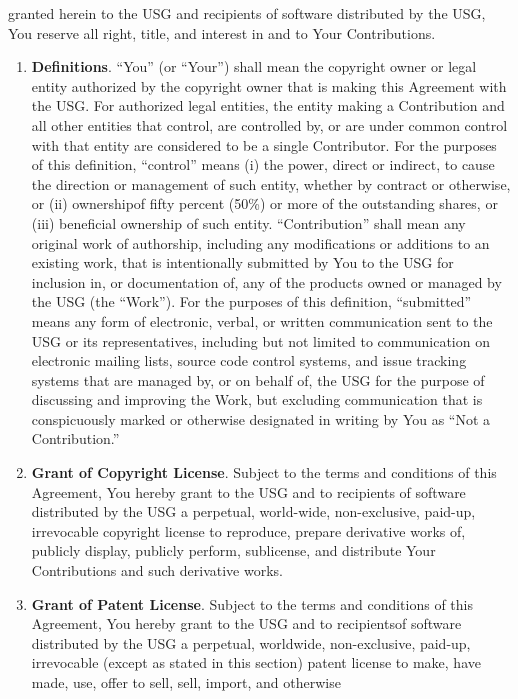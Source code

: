 \documentclass[8pt]{article}
\begin{document}
\begin{Form}
granted herein to the USG and recipients of software distributed by the
USG, You reserve all right, title, and interest in and to Your
Contributions.
\begin{enumerate}
\def\labelenumi{\arabic{enumi}.}
\item
  \textbf{Definitions}. ``You'' (or ``Your'') shall mean the copyright
  owner or legal entity authorized by the copyright owner that is making
  this Agreement with the USG. For authorized legal entities, the entity
  making a Contribution and all other entities that control, are
  controlled by, or are under common control with that entity are
  considered to be a single Contributor. For the purposes of this
  definition, ``control'' means (i) the power, direct or indirect, to
  cause the direction or management of such entity, whether by contract
  or otherwise, or (ii) ownershipof fifty percent (50\%) or more of the
  outstanding shares, or (iii) beneficial ownership of such entity.
  ``Contribution'' shall mean any original work of authorship, including
  any modifications or additions to an existing work, that is
  intentionally submitted by You to the USG for inclusion in, or
  documentation of, any of the products owned or managed by the USG (the
  ``Work''). For the purposes of this definition, ``submitted'' means
  any form of electronic, verbal, or written communication sent to the
  USG or its representatives, including but not limited to communication
  on electronic mailing lists, source code control systems, and issue
  tracking systems that are managed by, or on behalf of, the USG for the
  purpose of discussing and improving the Work, but excluding
  communication that is conspicuously marked or otherwise designated in
  writing by You as ``Not a Contribution.''
\item
  \textbf{Grant of Copyright License}. Subject to the terms and
  conditions of this Agreement, You hereby grant to the USG and to
  recipients of software distributed by the USG a perpetual, world-wide,
  non-exclusive, paid-up, irrevocable copyright license to reproduce,
  prepare derivative works of, publicly display, publicly perform,
  sublicense, and distribute Your Contributions and such derivative
  works.
\item
  \textbf{Grant of Patent License}. Subject to the terms and conditions
  of this Agreement, You hereby grant to the USG and to recipientsof
  software distributed by the USG a perpetual, worldwide, non-exclusive,
  paid-up, irrevocable (except as stated in this section) patent license
  to make, have made, use, offer to sell, sell, import, and otherwise

\end{enumerate}
\end{Form}
\end{document}
